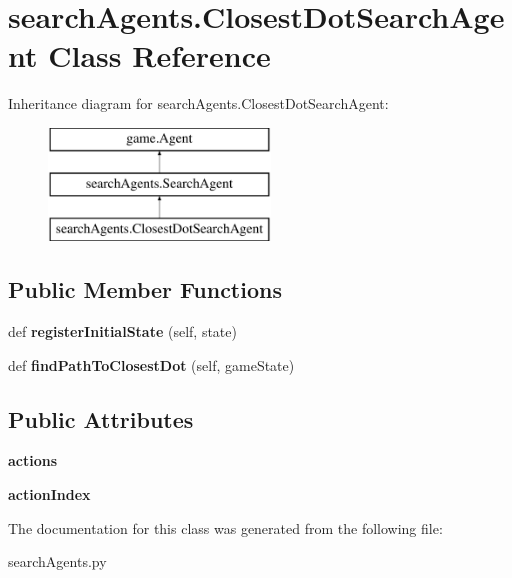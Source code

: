 \hypertarget{classsearch_agents_1_1_closest_dot_search_agent}{}\section{search\+Agents.\+Closest\+Dot\+Search\+Agent Class Reference}
\label{classsearch_agents_1_1_closest_dot_search_agent}
Inheritance diagram for search\+Agents.\+Closest\+Dot\+Search\+Agent\+:\begin{figure}[H]
\begin{center}
\leavevmode
\includegraphics[height=3.000000cm]{classsearch_agents_1_1_closest_dot_search_agent}
\end{center}
\end{figure}
\subsection*{Public Member Functions}
\begin{DoxyCompactItemize}
\item 
\mbox{\label{classsearch_agents_1_1_closest_dot_search_agent_aea2d09b148d9b56f9167139bf49d82d1}} 
def {\bfseries register\+Initial\+State} (self, state)
\item 
\mbox{\label{classsearch_agents_1_1_closest_dot_search_agent_a266dbaf93cf6709df5e7bcb083bf9911}} 
def {\bfseries find\+Path\+To\+Closest\+Dot} (self, game\+State)
\end{DoxyCompactItemize}
\subsection*{Public Attributes}
\begin{DoxyCompactItemize}
\item 
\mbox{\label{classsearch_agents_1_1_closest_dot_search_agent_aac05cab3211d743d08adddecdf672ffd}} 
{\bfseries actions}
\item 
\mbox{\label{classsearch_agents_1_1_closest_dot_search_agent_a03bba84feac1d7c928042ca27db3b600}} 
{\bfseries action\+Index}
\end{DoxyCompactItemize}


The documentation for this class was generated from the following file\+:\begin{DoxyCompactItemize}
\item 
search\+Agents.\+py\end{DoxyCompactItemize}
